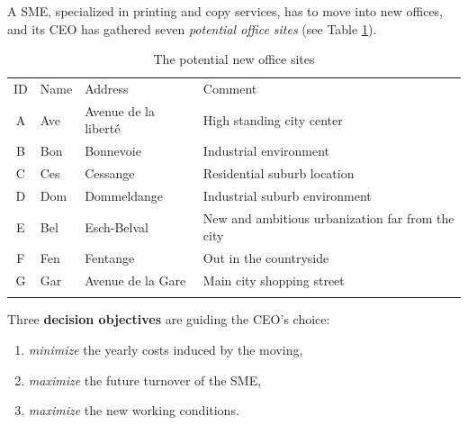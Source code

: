 A SME, specialized in printing and copy services, has to move into new offices, and its CEO has gathered seven \emph{potential office sites} (see Table \ref{tab:6.1}).
\begin{table}[h]
\caption{The potential new office sites}
\label{tab:6.1}       %
\begin{center}
    \begin{tabular}{c|l|l|l}
      \svhline\noalign{\smallskip}
      ID & Name & Address & Comment\\
      \noalign{\smallskip}\hline\noalign{\smallskip}
    A &   Ave  &  Avenue de la liberté &  High standing city center\\
    B &   Bon  &  Bonnevoie &             Industrial environment\\
    C &   Ces  &  Cessange &              Residential suburb location\\
    D &   Dom  &  Dommeldange &           Industrial suburb environment\\
    E &   Bel  &  Esch-Belval &           New and ambitious urbanization far from the city\\
    F &   Fen  &  Fentange &              Out in the countryside\\
      G &   Gar  &  Avenue de la Gare &     Main city shopping street\\
      \noalign{\smallskip}\hline
    \end{tabular}
\end{center}
\end{table}

Three \textbf{decision objectives} are guiding the CEO's choice:
\begin{enumerate}
\item \emph{minimize} the yearly costs induced by the moving,
\item \emph{maximize} the future turnover of the SME,
\item \emph{maximize} the new working conditions.
\end{enumerate}

